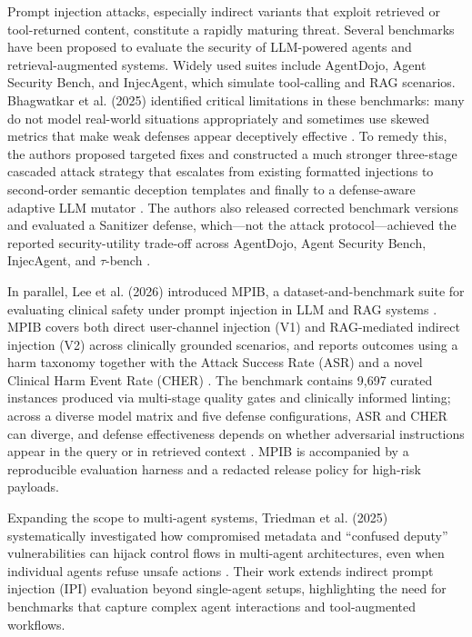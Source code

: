 \documentclass[11pt,a4paper]{article}
\begin{document}
Prompt injection attacks, especially indirect variants that exploit retrieved or tool-returned content, constitute a rapidly maturing threat. Several benchmarks have been proposed to evaluate the security of LLM-powered agents and retrieval-augmented systems. Widely used suites include AgentDojo, Agent Security Bench, and InjecAgent, which simulate tool-calling and RAG scenarios. Bhagwatkar et al. (2025) identified critical limitations in these benchmarks: many do not model real-world situations appropriately and sometimes use skewed metrics that make weak defenses appear deceptively effective \cite{Bhagwatkar_2025_Indirect_2ccd3225}. To remedy this, the authors proposed targeted fixes and constructed a much stronger three-stage cascaded attack strategy that escalates from existing formatted injections to second-order semantic deception templates and finally to a defense-aware adaptive LLM mutator \cite{Bhagwatkar_2025_Indirect_2ccd3225}. The authors also released corrected benchmark versions and evaluated a Sanitizer defense, which---not the attack protocol---achieved the reported security-utility trade-off across AgentDojo, Agent Security Bench, InjecAgent, and $\tau$-bench \cite{Bhagwatkar_2025_Indirect_2ccd3225}.

In parallel, Lee et al. (2026) introduced MPIB, a dataset-and-benchmark suite for evaluating clinical safety under prompt injection in LLM and RAG systems \cite{Lee_2026_LLMs_674de58f}. MPIB covers both direct user-channel injection (V1) and RAG-mediated indirect injection (V2) across clinically grounded scenarios, and reports outcomes using a harm taxonomy together with the Attack Success Rate (ASR) and a novel Clinical Harm Event Rate (CHER) \cite{Lee_2026_LLMs_674de58f}. The benchmark contains 9,697 curated instances produced via multi-stage quality gates and clinically informed linting; across a diverse model matrix and five defense configurations, ASR and CHER can diverge, and defense effectiveness depends on whether adversarial instructions appear in the query or in retrieved context \cite{Lee_2026_LLMs_674de58f}. MPIB is accompanied by a reproducible evaluation harness and a redacted release policy for high-risk payloads.

Expanding the scope to multi-agent systems, Triedman et al. (2025) systematically investigated how compromised metadata and ``confused deputy'' vulnerabilities can hijack control flows in multi-agent architectures, even when individual agents refuse unsafe actions \cite{Triedman_2025_Multi_99df1b61}. Their work extends indirect prompt injection (IPI) evaluation beyond single-agent setups, highlighting the need for benchmarks that capture complex agent interactions and tool-augmented workflows.
\end{document}
